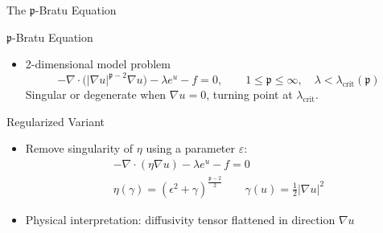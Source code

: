 \begin{frame}{The $\mathfrak{p}$-Bratu Equation}

  \begin{block}{$\mathfrak{p}$-Bratu Equation}
  \begin{itemize}
  \item 2-dimensional model problem
    \begin{equation*}
      -\nabla \cdot \bigl(\vert\nabla u\vert^{\mathfrak{p}-2} \nabla u \bigr) - \lambda e^u - f = 0, \qquad 1 \le \mathfrak{p} \le \infty, \quad \lambda < \lambda_{\text{crit}}(\mathfrak{p})
    \end{equation*}
    Singular or degenerate when $\nabla u = 0$, turning point at $\lambda_{\text{crit}}$.
  \end{itemize}
  \end{block}
  
  \begin{block}{Regularized Variant}
  \begin{itemize}
  \item Remove singularity of $\eta$ using a parameter $\varepsilon$:
    \begin{gather*}
      -\nabla \cdot (\eta \nabla u) - \lambda e^u - f = 0 \\
      \eta(\gamma) = (\epsilon^2 + \gamma)^{\frac{\mathfrak{p}-2}{2}} \qquad \gamma(u) = \frac{1}{2} \vert\nabla u\vert^2
    \end{gather*}
  \item       Physical interpretation: diffusivity tensor flattened in direction $\nabla u$
  \end{itemize}
  \end{block}
\end{frame}



